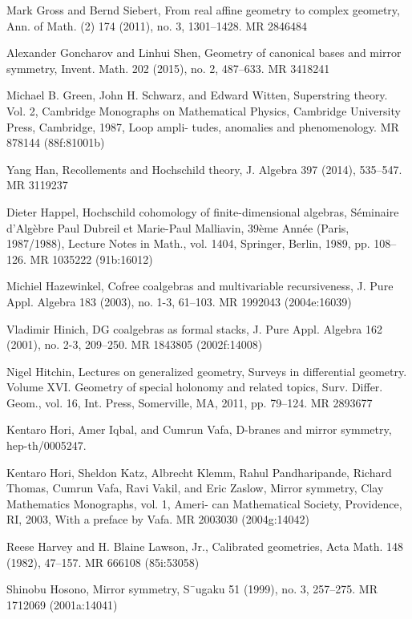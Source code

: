{\begin{list}{}{%
  \setlength{\leftmargin}{3.4em}%
  \setlength{\itemindent}{-3.4em}%
  \setlength{\itemsep}{1.5pt}%
  \setlength{\parsep}{0pt}%
  \setlength{\listparindent}{0pt}%
}
\item[{[GS11]}] Mark Gross and Bernd Siebert, From real affine geometry to complex geometry, Ann. of Math. (2) 174 (2011), no. 3, 1301--1428. MR 2846484
\item[{[GS15]}] Alexander Goncharov and Linhui Shen, Geometry of canonical bases and mirror symmetry, Invent. Math. 202 (2015), no. 2, 487--633. MR 3418241
\item[{[GSW87]}] Michael B. Green, John H. Schwarz, and Edward Witten, Superstring theory. Vol. 2, Cambridge Monographs on Mathematical Physics, Cambridge University Press, Cambridge, 1987, Loop ampli- tudes, anomalies and phenomenology. MR 878144 (88f:81001b)
\item[{[Han14]}] Yang Han, Recollements and Hochschild theory, J. Algebra 397 (2014), 535--547. MR 3119237
\item[{[Hap89]}] Dieter Happel, Hochschild cohomology of finite-dimensional algebras, Séminaire d’Algèbre Paul Dubreil et Marie-Paul Malliavin, 39ème Année (Paris, 1987/1988), Lecture Notes in Math., vol. 1404, Springer, Berlin, 1989, pp. 108--126. MR 1035222 (91b:16012)
\item[{[Haz03]}] Michiel Hazewinkel, Cofree coalgebras and multivariable recursiveness, J. Pure Appl. Algebra 183 (2003), no. 1-3, 61--103. MR 1992043 (2004e:16039)
\item[{[Hin01]}] Vladimir Hinich, DG coalgebras as formal stacks, J. Pure Appl. Algebra 162 (2001), no. 2-3, 209--250. MR 1843805 (2002f:14008)
\item[{[Hit11]}] Nigel Hitchin, Lectures on generalized geometry, Surveys in differential geometry. Volume XVI. Geometry of special holonomy and related topics, Surv. Differ. Geom., vol. 16, Int. Press, Somerville, MA, 2011, pp. 79--124. MR 2893677
\item[{[HIV]}] Kentaro Hori, Amer Iqbal, and Cumrun Vafa, D-branes and mirror symmetry, hep-th/0005247.
\item[{[HKK+03]}] Kentaro Hori, Sheldon Katz, Albrecht Klemm, Rahul Pandharipande, Richard Thomas, Cumrun Vafa, Ravi Vakil, and Eric Zaslow, Mirror symmetry, Clay Mathematics Monographs, vol. 1, Ameri- can Mathematical Society, Providence, RI, 2003, With a preface by Vafa. MR 2003030 (2004g:14042)
\item[{[HL82]}] Reese Harvey and H. Blaine Lawson, Jr., Calibrated geometries, Acta Math. 148 (1982), 47--157. MR 666108 (85i:53058)
\item[{[Hos99]}] Shinobu Hosono, Mirror symmetry, S¯ugaku 51 (1999), no. 3, 257--275. MR 1712069 (2001a:14041)

\end{list}}
